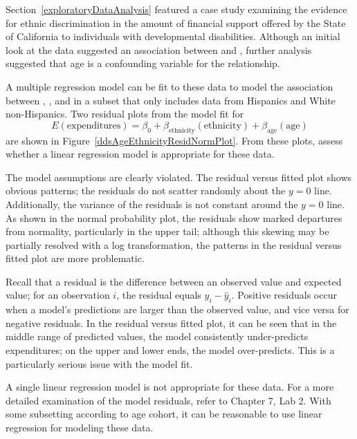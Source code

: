 \begin{examplewrap}
\begin{nexample}{Section~\ref{exploratoryDataAnalysis} featured a case study examining the evidence for ethnic discrimination in the amount of financial support offered by the State of California to individuals with developmental disabilities. Although an initial look at the data suggested an association between  and , further analysis suggested that age is a confounding variable for the relationship.\vspace{3mm}

A multiple regression model can be fit to these data to model the association between , , and  in a subset that only includes data from Hispanics and White non-Hispanics. Two residual plots from the model fit for 
\[E(\text{expenditures}) = \beta_0 +  \beta_{\text{ethnicity}}(\text{ethnicity}) + \beta_{\text{age}}(\text{age}) \]
are shown in Figure~\ref{ddsAgeEthnicityResidNormPlot}. From these plots, assess whether a linear regression model is appropriate for these data.}

The model assumptions are clearly violated. The residual versus fitted plot	shows obvious patterns; the residuals do not scatter randomly about the $y = 0$ line. Additionally, the variance of the residuals is not constant around the $y = 0$ line. As shown in the normal probability plot, the residuals show marked departures from normality, particularly in the upper tail; although this skewing may be partially resolved with a log transformation, the patterns in the residual versus fitted plot are more problematic.

Recall that a residual is the difference between an observed value and expected value; for an observation $i$, the residual equals $y_i - \hat{y}_i$. Positive residuals occur when a model's predictions are larger than the observed value, and vice versa for negative residuals. In the residual versus fitted plot, it can be seen that in the middle range of predicted values, the model consistently under-predicts expenditures; on the upper and lower ends, the model over-predicts. This is a particularly serious issue with the model fit. 

A single linear regression model is not appropriate for these data. For a more detailed examination of the model residuals, refer to Chapter 7, Lab 2. With some subsetting according to age cohort, it can be reasonable to use linear regression for modeling these data.
\end{nexample}
\end{examplewrap}

